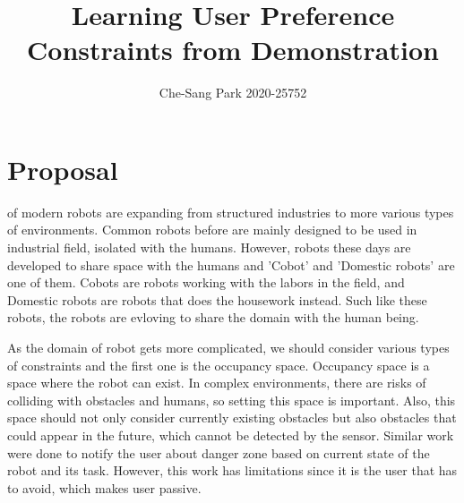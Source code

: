 \documentclass[lettersize,journal]{IEEEtran}
\begin{document}
\title{Learning User Preference Constraints from Demonstration}
\author{ Che-Sang Park 2020-25752%
}


\maketitle




\section{Proposal}
 of modern robots are expanding from structured industries to more various types of environments.
Common robots before are mainly designed to be used in industrial field, isolated with the humans.
However, robots these days are developed to share space with the humans and 'Cobot' and 'Domestic robots' are one of them.
Cobots are robots working with the labors in the field, and Domestic robots are robots that does the housework instead.
Such like these robots, the robots are evloving to share the domain with the human being.

As the domain of robot gets more complicated, we should consider various types of constraints and the first one is the occupancy space. 
Occupancy space is a space where the robot can exist.
In complex environments, there are risks of colliding with obstacles and humans, so setting this space is important.
Also, this space should not only consider currently existing obstacles but also obstacles that could appear in the future, which cannot be detected by the sensor.
Similar work were done to notify the user about danger zone based on current state of the robot and its task\cite{AR-Based_interaction}.
However, this work has limitations since it is the user that has to avoid, which makes user passive.
\end{document}
